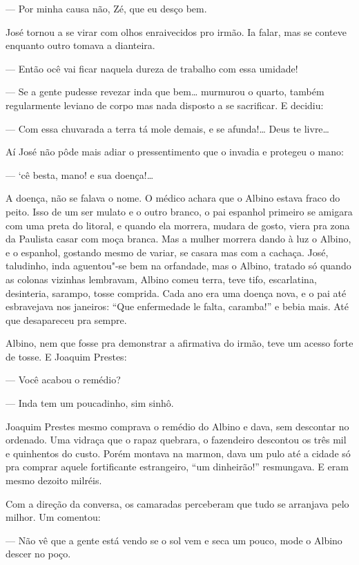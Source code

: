 \begin{linenumbers}
--- Por minha causa não, Zé, que eu desço bem.

José tornou a se virar com olhos enraivecidos pro irmão. Ia falar, mas
se conteve enquanto outro tomava a dianteira.

--- Então ocê vai ficar naquela dureza de trabalho com essa umidade!

--- Se a gente pudesse revezar inda que bem\ldots{} murmurou o quarto, também
regularmente leviano de corpo mas nada disposto a se sacrificar. E
decidiu:

--- Com essa chuvarada a terra tá mole demais, e se afunda!\ldots{} Deus te
livre\ldots{}

Aí José não pôde mais adiar o pressentimento que o invadia e protegeu o
mano:

--- `cê besta, mano! e sua doença!\ldots{}

A doença, não se falava o nome. O médico achara que o Albino estava
fraco do peito. Isso de um ser mulato e o outro branco, o pai espanhol
primeiro se amigara com uma preta do litoral, e quando ela morrera,
mudara de gosto, viera pra zona da Paulista casar com moça branca. Mas a
mulher morrera dando à luz o Albino, e o espanhol, gostando mesmo de
variar, se casara mas com a cachaça. José, taludinho, inda aguentou"-se
bem na orfandade, mas o Albino, tratado só quando as colonas vizinhas
lembravam, Albino comeu terra, teve tifo, escarlatina, desinteria,
sarampo, tosse comprida. Cada ano era uma doença nova, e o pai até
esbravejava nos janeiros: ``Que enfermedade le falta, caramba!'' e bebia
mais. Até que desapareceu pra sempre.

Albino, nem que fosse pra demonstrar a afirmativa do irmão, teve um
acesso forte de tosse. E Joaquim Prestes:

--- Você acabou o remédio?

--- Inda tem um poucadinho, sim sinhô.

Joaquim Prestes mesmo comprava o remédio do Albino e dava, sem descontar
no ordenado. Uma vidraça que o rapaz quebrara, o fazendeiro descontou os
três mil e quinhentos do custo. Porém montava na marmon, dava um pulo
até a cidade só pra comprar aquele fortificante estrangeiro, ``um
dinheirão!'' resmungava. E eram mesmo dezoito milréis.

Com a direção da conversa, os camaradas perceberam que tudo se arranjava
pelo milhor. Um comentou:

--- Não vê que a gente está vendo se o sol vem e seca um pouco, mode o
Albino descer no poço.


\end{linenumbers}
